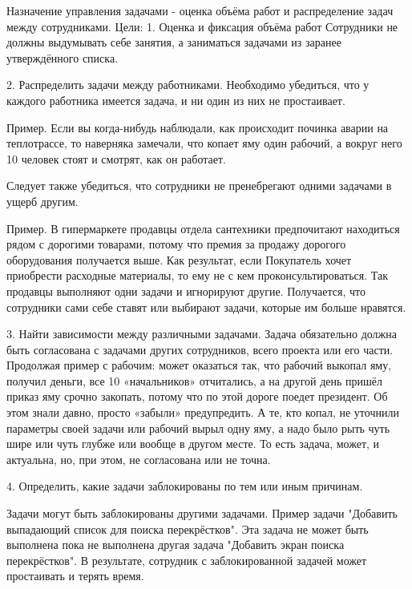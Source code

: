 \documentclass{../industrial-development}
\begin{document}
Назначение управления задачами - оценка объёма работ и распределение задач между сотрудниками.
Цели:
1. Оценка и фиксация объёма работ
Сотрудники не должны выдумывать себе занятия, а заниматься задачами из заранее утверждённого списка.

2. Распределить задачи между работниками.
Необходимо убедиться, что у каждого работника имеется задача, и ни один из них не простаивает.

Пример. Если вы когда-нибудь наблюдали, как происходит починка аварии на теплотрассе, то наверняка замечали, что копает яму один рабочий, а вокруг него 10 человек стоят и смотрят, как он работает.

Следует также убедиться, что сотрудники не пренебрегают одними задачами в ущерб другим.

Пример. В гипермаркете продавцы отдела сантехники предпочитают находиться рядом с дорогими товарами, потому что премия за продажу дорогого оборудования получается выше. Как результат, если Покупатель хочет приобрести расходные материалы, то ему не с кем проконсультироваться. Так продавцы выполняют одни задачи и игнорируют другие. Получается, что сотрудники сами себе ставят или выбирают задачи, которые им больше нравятся.

3. Найти зависимости между различными задачами.
Задача обязательно должна быть согласована с задачами других сотрудников, всего проекта или его части. Продолжая пример с рабочим: может оказаться так, что рабочий выкопал яму, получил деньги, все 10 «начальников» отчитались, а на другой день пришёл приказ яму срочно закопать, потому что по этой дороге поедет президент. Об этом знали давно, просто «забыли» предупредить. А те, кто копал, не уточнили параметры своей задачи или рабочий вырыл одну яму, а надо было рыть чуть шире или чуть глубже или вообще в другом месте. То есть задача, может, и актуальна, но, при этом, не согласована или не точна.

4. Определить, какие задачи заблокированы по тем или иным причинам. 

Задачи могут быть заблокированы другими задачами. Пример задачи "Добавить выпадающий список для поиска перекрёстков". Эта задача не может быть выполнена пока не выполнена другая задача "Добавить экран поиска перекрёстков". В результате, сотрудник с заблокированной задачей может простаивать и терять время.
\end{document}
